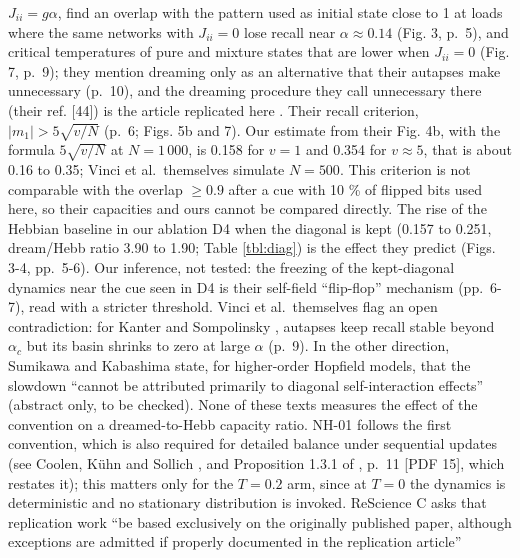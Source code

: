 \begin{enumerate}
  \(J_{ii} = g\alpha\), find an overlap with the pattern used as initial
  state close to 1 at loads where the same networks with \(J_{ii} = 0\)
  lose recall near \(\alpha \approx 0.14\) (Fig. 3, p.~5), and critical
  temperatures of pure and mixture states that are lower when
  \(J_{ii} = 0\) (Fig. 7, p.~9); they mention dreaming only as an
  alternative that their autapses make unnecessary (p.~10), and the
  dreaming procedure they call unnecessary there (their ref. {[}44{]})
  is the article replicated here \supercite{fachechi2019dreaming}. Their
  recall criterion, \(|m_1| > 5\sqrt{v/N}\) (p.~6; Figs. 5b and 7). Our
  estimate from their Fig. 4b, with the formula \(5\sqrt{v/N}\) at
  \(N = 1\,000\), is 0.158 for \(v = 1\) and 0.354 for \(v \approx 5\),
  that is about 0.16 to 0.35; Vinci et al.~themselves simulate
  \(N = 500\). This criterion is not comparable with the overlap
  \(\ge 0.9\) after a cue with 10 \% of flipped bits used here, so their
  capacities and ours cannot be compared directly. The rise of the
  Hebbian baseline in our ablation D4 when the diagonal is kept (0.157
  to 0.251, dream/Hebb ratio 3.90 to 1.90; Table \ref{tbl:diag}) is the
  effect they predict (Figs. 3-4, pp.~5-6). Our inference, not tested:
  the freezing of the kept-diagonal dynamics near the cue seen in D4 is
  their self-field ``flip-flop'' mechanism (pp.~6-7), read with a
  stricter threshold. Vinci et al.~themselves flag an open
  contradiction: for Kanter and Sompolinsky
  \supercite{kanter1987projector}, autapses keep recall stable beyond
  \(\alpha_c\) but its basin shrinks to zero at large \(\alpha\) (p.~9).
  In the other direction, Sumikawa and Kabashima
  \supercite{sumikawa2026diagonal} state, for higher-order Hopfield
  models, that the slowdown ``cannot be attributed primarily to diagonal
  self-interaction effects'' (abstract only, to be checked). None of
  these texts measures the effect of the convention on a dreamed-to-Hebb
  capacity ratio. NH-01 follows the first convention, which is also
  required for detailed balance under sequential updates (see Coolen,
  Kühn and Sollich \supercite{coolen2005theory}, and Proposition 1.3.1 of
  \supercite{aquaro2025thesis}, p.~11 {[}PDF 15{]}, which restates it);
  this matters only for the \(T = 0.2\) arm, since at \(T = 0\) the
  dynamics is deterministic and no stationary distribution is invoked.
  ReScience C asks that replication work ``be based exclusively on the
  originally published paper, although exceptions are admitted if
  properly documented in the replication article''
  \supercite{rougier2017rescience}


\end{enumerate}
